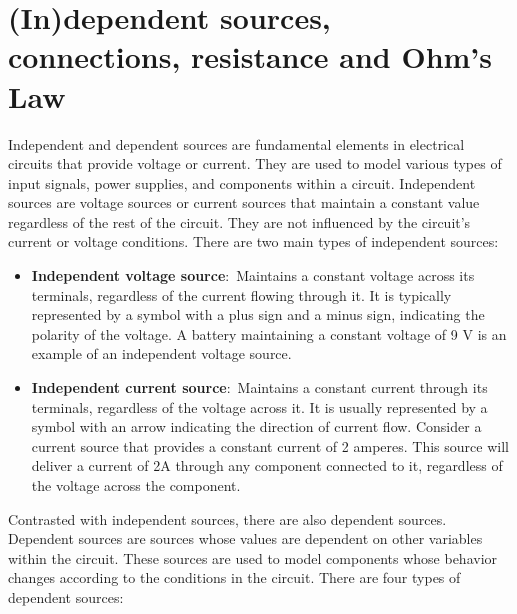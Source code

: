\documentclass[nobib]{tufte-handout}
\newcommand{\defn}[2]{\noindent\textbf{#1}:\ #2}
\begin{document}
\section{(In)dependent sources, connections, resistance and Ohm's Law}
Independent and dependent sources are fundamental elements in 
electrical circuits that provide voltage or current. 
They are used to model various types of input signals, 
power supplies, and components within a circuit.
Independent sources are voltage sources or current sources 
that maintain a constant value regardless of the rest of the 
circuit. They are not influenced by the circuit's current or 
voltage conditions. There are two main types of independent 
sources:
\begin{itemize}
    \item \defn{Independent voltage source}{Maintains a constant 
    voltage across its terminals, regardless of the current 
    flowing through it. It is typically represented by a 
    symbol with a plus sign and a minus sign, indicating 
    the polarity of the voltage.} A battery maintaining a constant
    voltage of 9 V is an example of an independent voltage source.
    \item \defn{Independent current source}{Maintains a constant 
    current through its terminals, regardless of the 
    voltage across it. It is usually represented by 
    a symbol with an arrow indicating the 
    direction of current flow.} Consider a current source that 
    provides a constant current of 2 amperes. This source 
    will deliver a current of 2A through any component 
    connected to it, regardless of the 
    voltage across the component.
\end{itemize}
Contrasted with independent sources, there are also
dependent sources. Dependent sources are sources 
whose values are 
dependent on other variables within the circuit. 
These sources are used to model components whose 
behavior changes according to the conditions in 
the circuit. There are four types of dependent sources:
\end{document}

